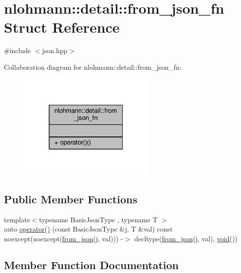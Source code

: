 \hypertarget{structnlohmann_1_1detail_1_1from__json__fn}{}\section{nlohmann\+:\+:detail\+:\+:from\+\_\+json\+\_\+fn Struct Reference}
\label{structnlohmann_1_1detail_1_1from__json__fn}


{\ttfamily \#include $<$json.\+hpp$>$}



Collaboration diagram for nlohmann\+:\+:detail\+:\+:from\+\_\+json\+\_\+fn\+:
\nopagebreak
\begin{figure}[H]
\begin{center}
\leavevmode
\includegraphics[width=193pt]{structnlohmann_1_1detail_1_1from__json__fn__coll__graph}
\end{center}
\end{figure}
\subsection*{Public Member Functions}
\begin{DoxyCompactItemize}
\item 
{\footnotesize template$<$typename Basic\+Json\+Type , typename T $>$ }\\auto \hyperlink{structnlohmann_1_1detail_1_1from__json__fn_a6d14a74e1043072c77892534572d2973}{operator()} (const Basic\+Json\+Type \&j, T \&val) const noexcept(noexcept(\hyperlink{namespacenlohmann_1_1detail_a1f0395aad0fe853a4539288749d3a603}{from\+\_\+json}(j, val))) -\/$>$ decltype(\hyperlink{namespacenlohmann_1_1detail_a1f0395aad0fe853a4539288749d3a603}{from\+\_\+json}(j, val), \hyperlink{namespacenlohmann_1_1detail_a59fca69799f6b9e366710cb9043aa77d}{void}())
\end{DoxyCompactItemize}


\subsection{Member Function Documentation}
